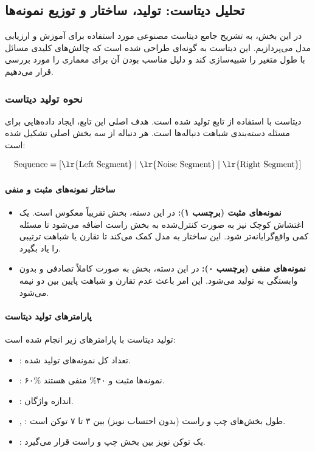 \documentclass{article}
\begin{document}
\newpage
\subsection{تحلیل دیتاست: تولید، ساختار و توزیع نمونه‌ها}

در این بخش، به تشریح جامع دیتاست مصنوعی مورد استفاده برای آموزش و ارزیابی مدل  می‌پردازیم. این دیتاست به گونه‌ای طراحی شده است که چالش‌های کلیدی مسائل  با طول متغیر را شبیه‌سازی کند و دلیل مناسب بودن آن برای معماری  را مورد بررسی قرار می‌دهیم.

\subsubsection{نحوه تولید دیتاست}

دیتاست با استفاده از تابع  تولید شده است. هدف اصلی این تابع، ایجاد داده‌هایی برای مسئله دسته‌بندی شباهت دنباله‌ها است. هر دنباله از سه بخش اصلی تشکیل شده است:

\begin{equation}
	\text{Sequence} = [\text{\lr{Left Segment}} \; | \; \text{\lr{Noise Segment}} \; | \; \text{\lr{Right Segment}}]
\end{equation}

\paragraph{ساختار نمونه‌های مثبت و منفی}
\begin{itemize}
	\item \textbf{نمونه‌های مثبت (برچسب ۱):} در این دسته، بخش  تقریباً معکوس  است. یک اغتشاش کوچک نیز به صورت کنترل‌شده به بخش راست اضافه می‌شود تا مسئله کمی واقع‌گرایانه‌تر شود. این ساختار به مدل کمک می‌کند تا تقارن یا شباهت ترتیبی را یاد بگیرد.
	\item \textbf{نمونه‌های منفی (برچسب ۰):} در این دسته، بخش  به صورت کاملاً تصادفی و بدون وابستگی به  تولید می‌شود. این امر باعث عدم تقارن و شباهت پایین بین دو نیمه می‌شود.
\end{itemize}

\paragraph{پارامترهای تولید دیتاست}
تولید دیتاست با پارامترهای زیر انجام شده است:
\begin{itemize}
	\item {}: تعداد کل نمونه‌های تولید شده.
	\item {}: ۶۰\% نمونه‌ها مثبت و ۴۰\% منفی هستند.
	\item {}: اندازه واژگان.
	\item {}, : طول بخش‌های چپ و راست (بدون احتساب نویز) بین ۳ تا ۷ توکن است.
	\item {}: یک توکن نویز بین بخش چپ و راست قرار می‌گیرد.
\end{itemize}
\end{document}
